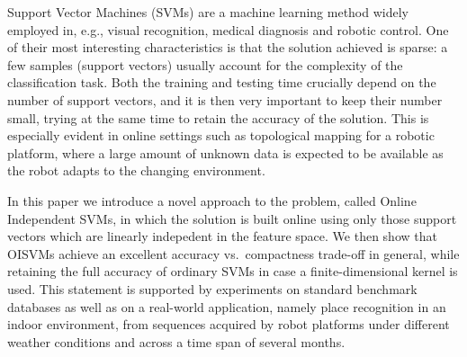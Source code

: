 Support Vector Machines (SVMs) are a machine learning method widely
employed in, e.g., visual recognition, medical diagnosis and robotic
control. One of their most interesting characteristics is that the
solution achieved is sparse: a few samples (support vectors) usually
account for the complexity of the classification task. Both the
training and testing time crucially depend on the number of support
vectors, and it is then very important to keep their number small,
trying at the same time to retain the accuracy of the solution. This
is especially evident in online settings such as topological mapping
for a robotic platform, where a large amount of unknown data is
expected to be available as the robot adapts to the changing
environment.

In this paper we introduce a novel approach to the problem, called
Online Independent SVMs, in which the solution is built online using
only those support vectors which are linearly indepedent in the
feature space. We then show that OISVMs achieve an excellent accuracy
vs.~compactness trade-off in general, while retaining the full
accuracy of ordinary SVMs in case a finite-dimensional kernel is
used. This statement is supported by experiments on standard benchmark
databases as well as on a real-world application, namely place
recognition in an indoor environment, from sequences acquired by robot
platforms under different weather conditions and across a time span of
several months.
